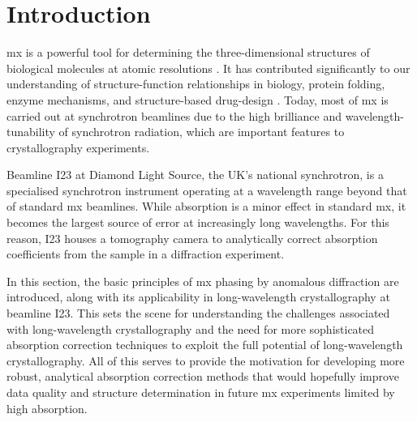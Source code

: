 \section{Introduction}


\ac{mx} is a powerful tool for determining the three-dimensional structures of biological molecules at atomic resolutions \cite{Gorrec2021}. It has contributed significantly to our understanding of structure-function relationships in biology, protein folding, enzyme mechanisms, and structure-based drug-design \cite{Foerster2019}. Today, most of \ac{mx} is carried out at synchrotron beamlines due to the high brilliance and wavelength-tunability of synchrotron radiation, which are important features to crystallography experiments.

Beamline I23 at Diamond Light Source, the UK's national synchrotron, is a specialised synchrotron instrument operating at a wavelength range beyond that of standard \ac{mx} beamlines. While absorption is a minor effect in standard \ac{mx}, it becomes the largest source of error at increasingly long wavelengths. For this reason, I23 houses a tomography camera to analytically correct absorption coefficients from the sample in a diffraction experiment.


In this section, the basic principles of \ac{mx} phasing by anomalous diffraction are introduced, along with its applicability in long-wavelength crystallography at beamline I23. This sets the scene for understanding the challenges associated with long-wavelength crystallography and the need for more sophisticated absorption correction techniques to exploit the full potential of long-wavelength crystallography. %
All of this serves to provide the motivation for developing more robust, analytical absorption correction methods that would hopefully improve data quality and structure determination in future \ac{mx} experiments limited by high absorption.

